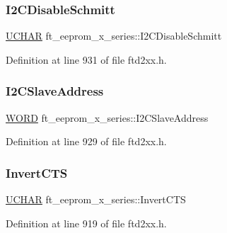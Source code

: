 \subsubsection{\texorpdfstring{I2\+C\+Disable\+Schmitt}{I2CDisableSchmitt}}
{\footnotesize\ttfamily \hyperlink{CatCaloProto40MHz_2inc_2WinTypes_8h_a4f4bb67531a9bf6f0b9c6ad76aeba587}{U\+C\+H\+AR} ft\+\_\+eeprom\+\_\+x\+\_\+series\+::\+I2\+C\+Disable\+Schmitt}



Definition at line 931 of file ftd2xx.\+h.

\mbox{\label{structft__eeprom__x__series_a41567e7ae1c0ee7b87957cade654d872}} 
\subsubsection{\texorpdfstring{I2\+C\+Slave\+Address}{I2CSlaveAddress}}
{\footnotesize\ttfamily \hyperlink{CatCaloProto40MHz_2inc_2WinTypes_8h_a197942eefa7db30960ae396d68339b97}{W\+O\+RD} ft\+\_\+eeprom\+\_\+x\+\_\+series\+::\+I2\+C\+Slave\+Address}



Definition at line 929 of file ftd2xx.\+h.

\mbox{\label{structft__eeprom__x__series_a9930d06b5d32e4ca1bf6c9c85e208cea}} 
\subsubsection{\texorpdfstring{Invert\+C\+TS}{InvertCTS}}
{\footnotesize\ttfamily \hyperlink{CatCaloProto40MHz_2inc_2WinTypes_8h_a4f4bb67531a9bf6f0b9c6ad76aeba587}{U\+C\+H\+AR} ft\+\_\+eeprom\+\_\+x\+\_\+series\+::\+Invert\+C\+TS}



Definition at line 919 of file ftd2xx.\+h.

\mbox{\label{structft__eeprom__x__series_ab65f05c85d65e72b2faf17ebe126f2f0}} 
